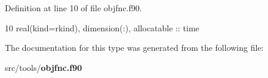 Definition at line 10 of file objfnc.\+f90.


\begin{DoxyCode}
10     \textcolor{keywordtype}{real(kind=rkind)}, \textcolor{keywordtype}{dimension(:)}, \textcolor{keywordtype}{allocatable} :: time
\end{DoxyCode}


The documentation for this type was generated from the following file\+:\begin{DoxyCompactItemize}
\item 
src/tools/{\bf objfnc.\+f90}\end{DoxyCompactItemize}
